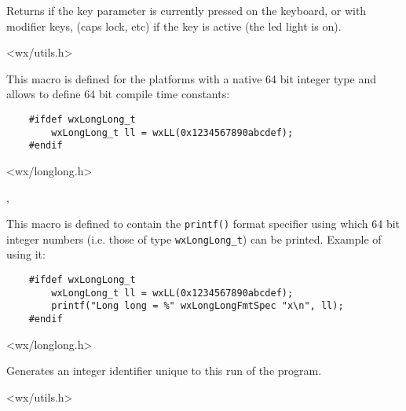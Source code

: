 Returns \true if the key parameter is currently pressed on the keyboard, or
with modifier keys, (caps lock, etc) if the key is active (the led light is
on).


<wx/utils.h>


\label{wxll}


This macro is defined for the platforms with a native 64 bit integer type and
allows to define 64 bit compile time constants:

\begin{verbatim}
    #ifdef wxLongLong_t
        wxLongLong_t ll = wxLL(0x1234567890abcdef);
    #endif
\end{verbatim}


<wx/longlong.h>


, 


\label{wxlonglongfmtspec}

This macro is defined to contain the {\tt printf()} format specifier using
which 64 bit integer numbers (i.e. those of type {\tt wxLongLong\_t}) can be
printed. Example of using it:

\begin{verbatim}
    #ifdef wxLongLong_t
        wxLongLong_t ll = wxLL(0x1234567890abcdef);
        printf("Long long = %" wxLongLongFmtSpec "x\n", ll);
    #endif
\end{verbatim}




<wx/longlong.h>


\label{wxnewid}


Generates an integer identifier unique to this run of the program.


<wx/utils.h>


\label{wxregisterid}


